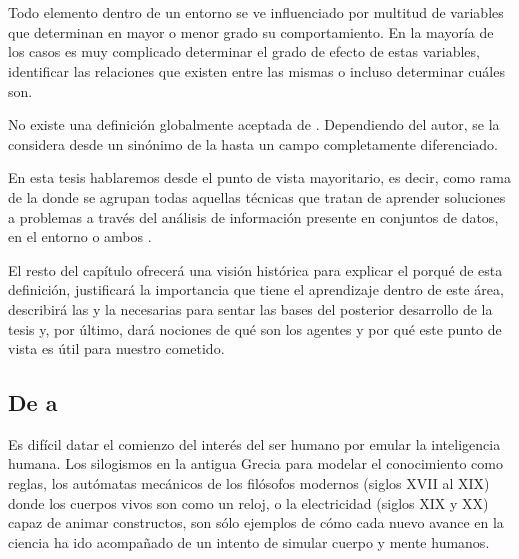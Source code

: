 \chapter{}
\label{ch:sota-ci}

Todo elemento dentro de un entorno se ve influenciado por multitud de variables que determinan en mayor o menor grado su comportamiento. En la mayoría de los casos es muy complicado determinar el grado de efecto de estas variables, identificar las relaciones que existen entre las mismas o incluso determinar cuáles son.

No existe una definición globalmente aceptada de . Dependiendo del autor, se la considera desde un sinónimo de la  hasta un campo completamente diferenciado.

En esta tesis hablaremos desde el punto de vista mayoritario, es decir, como rama de la  donde se agrupan todas aquellas técnicas que tratan de aprender soluciones a problemas a través del análisis de información presente en conjuntos de datos, en el entorno o ambos \cite{rutkowski2008computational, siddique2013computational}.

El resto del capítulo ofrecerá una visión histórica para explicar el porqué de esta definición, justificará la importancia que tiene el aprendizaje dentro de este área, describirá las  y la  necesarias para sentar las bases del posterior desarrollo de la tesis y, por último, dará nociones de qué son los agentes y por qué este punto de vista es útil para nuestro cometido.

\section{De  a }

Es difícil datar el comienzo del interés del ser humano por emular la inteligencia humana. Los silogismos en la antigua Grecia para modelar el conocimiento como reglas, los autómatas mecánicos de los filósofos modernos (siglos XVII al XIX) donde los cuerpos vivos son como un reloj, o la electricidad (siglos XIX y XX) capaz de animar constructos, son sólo ejemplos de cómo cada nuevo avance en la ciencia ha ido acompañado de un intento de simular cuerpo y mente humanos.

